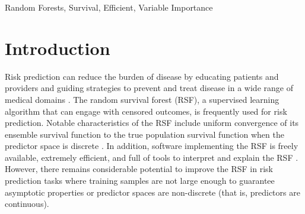\documentclass[twoside,11pt]{article}\usepackage[]{graphicx}\usepackage[]{xcolor}
\newcommand{\ie}{that is}
\begin{document}
\begin{abstract}%

The oblique random survival forest (ORSF) is an ensemble method for supervised learning that extends the random survival forest (RSF). Trees in the ORSF are grown using linear combinations of variables to create branches in the tree, whereas in the RSF a single variable is used. ORSF ensembles often have higher prediction accuracy than RSF ensembles, but the additional computational overhead of fitting ORSF ensembles limits their scope of application. In addition, few methods have been developed for interpretation of ORSF ensembles. In this article, we introduce and evaluate methods to accelerate the ORSF (\ie, reduce computational overhead) and compute the importance of individual variables in the ORSF We show that our strategy to accelerate the ORSF is up to 500 times faster than existing software for ORSFs (the \texttt{obliqueRSF} R package), and that prediction accuracy of the accelerated ORSF is equivalent or superior to that of existing ORSF methods. We estimate importance of variables for the ORSF by negating each coefficient used for the given variable in linear combinations, and then computing the reduction in out-of-bag accuracy. We show with simulation that  `negation importance' can discriminate between signal and noise variables, and it outperforms several state-of-the-art variable importance techniques in this task when there is correlation among predictors.

\end{abstract}

\begin{keywords}
  Random Forests, Survival, Efficient, Variable Importance
\end{keywords}

\section{Introduction}

Risk prediction can reduce the burden of disease by educating patients and providers and guiding strategies to prevent and treat disease in a wide range of medical domains \citep{moons2012riskII, moons2012riskI}. The random survival forest (RSF), a supervised learning algorithm that can engage with censored outcomes, is frequently used for risk prediction. Notable characteristics of the RSF include uniform convergence of its ensemble survival function to the true population survival function when the predictor space is discrete \citep{ishwaran2010consistency}. In addition, software implementing the RSF is freely available, extremely efficient, and full of tools to interpret and explain the RSF \citep{randomForestSRC, ranger, hothorn2010party}. However, there remains considerable potential to improve the RSF in risk prediction tasks where training samples are not large enough to guarantee asymptotic properties or predictor spaces are non-discrete (\ie, predictors are continuous).
\end{document}
